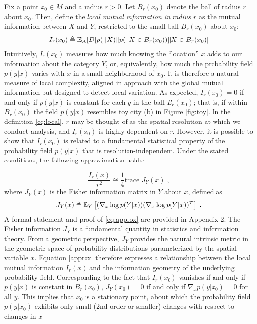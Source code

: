 	Fix a point $x_0 \in M$ and a radius $r > 0$. Let $B_r(x_0)$ denote the ball of radius $r$ about $x_0$. Then, define the \emph{local mutual information in radius $r$} as the mutual information between $X$ and $Y$, restricted to the small ball $B_r(x_0)$ about $x_0$:
	\begin{equation}
		I_r(x_0) \triangleq \mathbb{E}_X[D[p(\cdot|X)\| p(\cdot|X \in B_r(x_0))]|X \in B_r(x_0)] \label{eq:local}
	\end{equation}
	Intuitively, $I_r(x_0)$ measures how much knowing the ``location'' $x$ adds to our information about the category $Y$, or, equivalently, how much the probability field $p(y|x)$ varies with $x$ in a small neighborhood of $x_0$. It is therefore a natural measure of local complexity, aligned in approach with the global mutual information but designed to detect local variation. As expected, $I_r(x_0) = 0$ if and only if $p(y|x)$ is constant for each $y$ in the ball $B_r(x_0)$; that is, if within $B_r(x_0)$ the field $p(y|x)$ resembles toy city (b) in Figure \ref{fig:toy}. In the definition \eqref{eq:local}, $r$ may be thought of as the spatial resolution at which we conduct analysis, and $I_r(x_0)$ is highly dependent on $r$. However, it is possible to show that $I_r(x_0)$ is related to a fundamental statistical property of the probability field $p(y|x)$ that is resolution-independent. Under the stated conditions, the following approximation holds: 

	\begin{equation}
		\frac{I_r(x)}{r^2} \cong \frac{1}{4} \text{trace } J_Y(x)\;, \label{eq:approx}
	\end{equation}
	where $J_Y(x)$ is the Fisher information matrix in $Y$ about $x$, defined as 
	\begin{equation}
		J_Y(x) \triangleq \mathbb{E}_Y\left[ (\nabla_x \log p(Y|x))(\nabla_x \log p(Y|x))^T \right]\;.
	\end{equation}
	A formal statement and proof of \eqref{eq:approx} are provided in Appendix 2. The Fisher information $J_Y$ is a fundamental quantity in statistics and information theory. From a geometric perspective, $J_Y$ provides the natural intrinsic metric in the geometric space of probability distributions parameterized by the spatial variable $x$. Equation \eqref{approx} therefore expresses a relationship between the local mutual information $I_r(x)$ and the information geometry of the underlying probability field. Corresponding to the fact that $I_r(x_0)$ vanishes if and only if $p(y|x)$ is constant in $B_r(x_0)$, $J_Y(x_0) = 0$ if and only if $\nabla_x p(y|x_0) = 0$ for all $y$. This implies that $x_0$ is a stationary point, about which the probability field $p(y|x_0)$ exhibits only small (2nd order or smaller) changes with respect to changes in $x$. 

